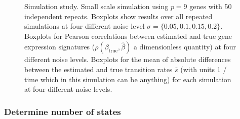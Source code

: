 \begin{figure}
  \centering
  \caption{Simulation study. Small scale simulation using $p=9$ genes with $50$ independent repeats. Boxplots show results over all repeated simulations at four different noise level $\sigma = \lbrace 0.05, 0.1, 0.15, 0.2 \rbrace $.  Boxplots for Pearson correlations between estimated and true gene expression signatures ($\rho(\beta_{\mathrm{true}},\hat{\beta})$ a dimensionless quantity) at four different noise levels.  Boxplots for the mean of absolute differences between the estimated and true transition rates $\bar{s}$ (with units 1 / time which in this simulation can be anything) for each simulation at four different noise levels. }
  \label{fig:small-scale-50}
\end{figure}

\subsubsection{Determine number of states}
\label{sec:determ-numb-stat}

